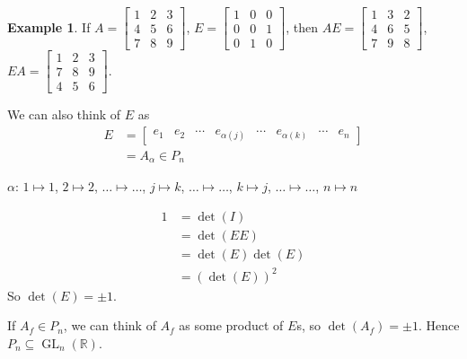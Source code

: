 \documentclass[12pt,letterpaper,DIV=11,final]{scrartcl}
\theoremstyle{plain}
\theoremstyle{definition}
\newtheorem{example}{Example}[section]
\theoremstyle{remark}
\DeclareMathOperator{\gl}{GL} %
\begin{document}
\begin{example}
  If $A = \begin{bmatrix}
    1 & 2 & 3 \\
    4 & 5 & 6 \\
    7 & 8 & 9
  \end{bmatrix}$, $E =
  \begin{bmatrix}
    1 & 0 & 0 \\
    0 & 0 & 1 \\
    0 & 1 & 0
  \end{bmatrix}$, then $AE =
  \begin{bmatrix}
    1 & 3 & 2 \\
    4 & 6 & 5 \\
    7 & 9 & 8
  \end{bmatrix}$, $EA =
  \begin{bmatrix}
    1 & 2 & 3 \\
    7 & 8 & 9 \\
    4 & 5 & 6
  \end{bmatrix}$.
\end{example}

We can also think of $E$ as
\begin{align*}
  E &= \begin{bmatrix} e_1 & e_2 & \cdots & e_{\alpha(j)} & \cdots & e_{\alpha(k)} & \cdots & e_n \end{bmatrix} \\
    &= A_\alpha \in P_n
\end{align*}

$\alpha$: $1 \mapsto 1$, $2 \mapsto 2$, $\dots \mapsto \dots$, $j \mapsto k$, $\dots \mapsto \dots$, $k \mapsto j$, $\dots \mapsto \dots$, $n \mapsto n$

\begin{align*}
  1 &= \det(I) \\
    &= \det(E E) \\
    &= \det(E) \det(E) \\
    &= {(\det(E))}^2
\end{align*}
So $\det(E) = \pm 1$.

If $A_f \in P_n$, we can think of $A_f$ as some product of $E$s, so $\det(A_f) = \pm 1$.
Hence $P_n \subseteq \gl_n(\mathbb{R})$.
\end{document}
